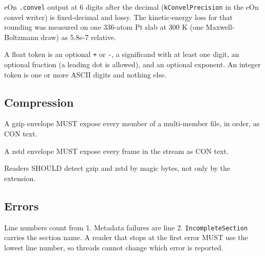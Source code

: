 eOn \texttt{.convel} output at 6 digits after the decimal
(\texttt{kConvelPrecision} in the eOn convel writer) is
fixed-decimal and lossy. The kinetic-energy loss for that rounding was
measured on one 336-atom Pt slab at 300 K (one Maxwell-Boltzmann draw)
as 5.8e-7 relative.

A float token is an optional \texttt{+} or \texttt{-}, a significand
with at least one digit, an optional fraction (a leading dot is
allowed), and an optional exponent. An integer token is one or more
ASCII digits and nothing else.

\subsection*{Compression}\label{spec:compression}

\begin{description}
\tightlist
\item[CON-compress.1 (MUST)] A gzip envelope MUST expose every member of a multi-member file,
in order, as CON text.
\item[CON-compress.2 (MUST)] A zstd envelope MUST expose every frame in the stream as CON
text.
\item[CON-compress.3 (SHOULD)] Readers SHOULD detect gzip and zstd by magic bytes, not only
by the extension.
\end{description}

\subsection*{Errors}\label{spec:errors}

Line numbers count from 1. Metadata failures are line 2.
\texttt{IncompleteSection} carries the section name. A reader that stops
at the first error MUST use the lowest line number, so threads cannot
change which error is reported.

